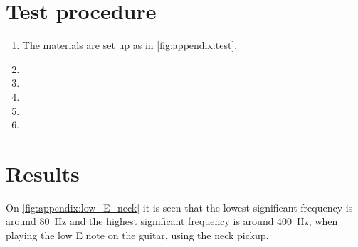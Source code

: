 %

\section*{Test procedure}


\begin{enumerate}
\item The materials are set up as in \autoref{fig:appendix:test}.
\item 
\item  
\item  
\item 
\item 
\end{enumerate}

\section*{Results}


On  \autoref{fig:appendix:low_E_neck} it is seen that the lowest significant frequency is around \SI{80}{\hertz} and the highest significant frequency is around \SI{400}{\hertz}, when playing the low E note on the guitar, using the neck pickup.

